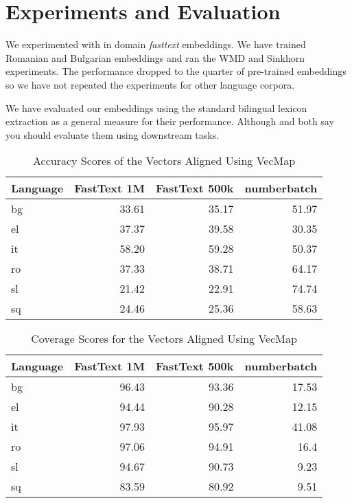 
\chapter{Experiments and Evaluation}%
\label{chap:experiments_and_evaluation}

We experimented with in domain \emph{fasttext} embeddings.
We have trained Romanian and Bulgarian embeddings and ran the WMD and Sinkhorn experiments.
The performance dropped to the quarter of pre-trained embeddings so we have not repeated the experiments for other language corpora.

We have evaluated our embeddings using the standard bilingual lexicon extraction as a general measure for their performance.
Although \textcite{ruder_survey_2017} and \textcite{glavas_how_2019} both say you should evaluate them using downstream tasks.

\begin{table}[htbp]
    \centering
    \begin{tabular}{lrrr}
        \toprule
        \textbf{Language} & \textbf{FastText 1M} & \textbf{FastText 500k} & \textbf{numberbatch} \\
        \midrule
        bg & 33.61 & 35.17 & 51.97 \\
        el & 37.37 & 39.58 & 30.35 \\
        it & 58.20 & 59.28 & 50.37 \\
        ro & 37.33 & 38.71 & 64.17 \\
        sl & 21.42 & 22.91 & 74.74 \\
        sq & 24.46 & 25.36 & 58.63 \\
        \bottomrule
    \end{tabular}
    \caption{Accuracy Scores of the Vectors Aligned Using VecMap}%
    \label{tab:accuracy_results}
\end{table}

\begin{table}[htbp]
    \centering
    \begin{tabular}{lrrr}
        \toprule
        \textbf{Language} & \textbf{FastText 1M} & \textbf{FastText 500k} & \textbf{numberbatch} \\
        \midrule
        bg & 96.43 & 93.36 & 17.53 \\
        el & 94.44 & 90.28 & 12.15 \\
        it & 97.93 & 95.97 & 41.08 \\
        ro & 97.06 & 94.91 & 16.4 \\
        sl & 94.67 & 90.73 & 9.23 \\
        sq & 83.59 & 80.92 & 9.51 \\
        \bottomrule
    \end{tabular}
    \caption{Coverage Scores for the Vectors Aligned Using VecMap}%
    \label{tab:coverage_results}
\end{table}
